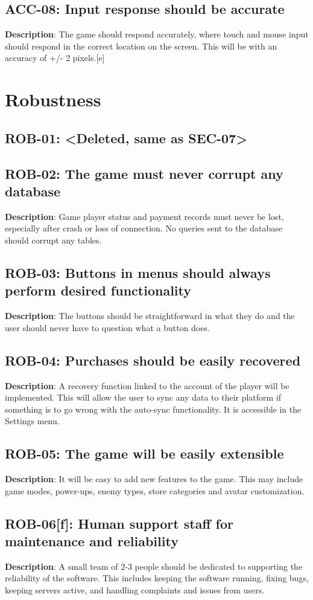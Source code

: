 \subsection{ACC-08: Input response should be accurate}
\textbf{Description}: The game should respond accurately, where touch and mouse
input should respond in the correct location on the screen. This will
be with an accuracy of +/- 2 pixels.{[}e{]}
\section{Robustness}
\subsection{ROB-01: <Deleted, same as SEC-07>}
\subsection{ROB-02: The game must never corrupt any database}
\textbf{Description}: Game player status and payment records must never be
lost, especially after crash or loss of connection. No queries sent
to the database should corrupt any tables.
\subsection{ROB-03: Buttons in menus should always perform desired functionality}
\textbf{Description}: The buttons should be straightforward in what they do
and the user should never have to question what a button does.
\subsection{ROB-04: Purchases should be easily recovered}
\textbf{Description}: A recovery function linked to the account of the player
will be implemented. This will allow the user to sync any data to
their platform if something is to go wrong with the auto-sync functionality.
It is accessible in the Settings menu.
\subsection{ROB-05: The game will be easily extensible}
\textbf{Description}: It will be easy to add new features to the game. This
may include game modes, power-ups, enemy types, store categories and
avatar customization.
\subsection{ROB-06{[}f{]}: Human support staff for maintenance and reliability}
\textbf{Description}: A small team of 2-3 people should be dedicated to supporting
the reliability of the software. This includes keeping the software
running, fixing bugs, keeping servers active, and handling complaints
and issues from users.
